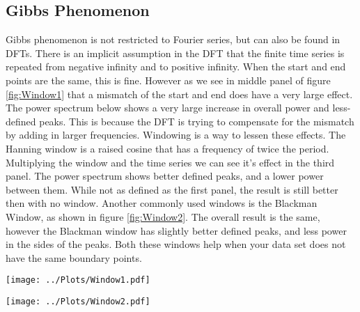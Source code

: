 \documentclass[twocolumn]{myarticle}
\begin{document}
\subsection{Gibbs Phenomenon}
Gibbs phenomenon is not restricted to Fourier series, but can also be found in DFTs. There is an implicit assumption in the DFT that the finite time series is repeated from negative infinity and to positive infinity. When the start and end points are the same, this is fine. However as we see in middle panel of figure \ref{fig:Window1} that a mismatch of the start and end does have a very large effect. The power spectrum below shows a very large increase in overall power and less-defined peaks. This is because the DFT is trying to compensate for the mismatch by adding in larger frequencies. Windowing is a way to lessen these effects. The Hanning window is a raised cosine that has a frequency of twice the period. Multiplying the window and the time series we can see it's effect in the third panel. The power spectrum shows better defined peaks, and a lower power between them. While not as defined as the first panel, the result is still better then with no window. Another commonly used windows is the Blackman Window, as shown in figure \ref{fig:Window2}. The overall result is the same, however the Blackman window has slightly better defined peaks, and less power in the sides of the peaks. Both these windows help when your data set does not have the same boundary points.

\begin{figure*}[htpb]
    \centering
    \texttt{[image: ../Plots/Window1.pdf]}
    \caption{%
        Looking at the Hanning window. The top resents the time series of a plain sine wave, a sine wave that is not periodic in the interval, and the effect of the Hanning window on the non-periodic wave. The bottom displays the corresponding power spectra.
    }
    \label{fig:Window1}
\end{figure*}

\begin{figure*}[htpb]
    \centering
    \texttt{[image: ../Plots/Window2.pdf]}
    \caption{%
        Looking at the Blackman window. The top resents the time series of a plain sine wave, a sine wave that is not periodic in the interval, and the effect of the Hanning window on the non-periodic wave. The bottom displays the corresponding power spectra.
    }
    \label{fig:Window2}
\end{figure*}

\onecolumn
\end{document}
